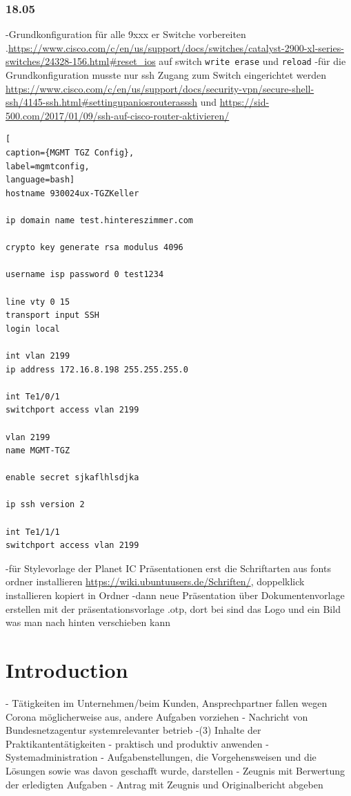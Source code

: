 \documentclass[english,runningheads,a4paper]{llncs}[2018/03/10]
\begin{document}
\subsubsection{18.05}
-Grundkonfiguration für alle 9xxx er Switche vorbereiten
.\url{https://www.cisco.com/c/en/us/support/docs/switches/catalyst-2900-xl-series-switches/24328-156.html#reset_ios} auf switch \texttt{write erase} und \texttt{reload}
-für die Grundkonfiguration musste nur ssh Zugang zum Switch eingerichtet werden \url{https://www.cisco.com/c/en/us/support/docs/security-vpn/secure-shell-ssh/4145-ssh.html#settingupaniosrouterasssh} und \url{https://sid-500.com/2017/01/09/ssh-auf-cisco-router-aktivieren/}
\begin{lstlisting}[
caption={MGMT TGZ Config},
label=mgmtconfig,
language=bash]
hostname 930024ux-TGZKeller

ip domain name test.hintereszimmer.com

crypto key generate rsa modulus 4096

username isp password 0 test1234

line vty 0 15
transport input SSH
login local

int vlan 2199
ip address 172.16.8.198 255.255.255.0

int Te1/0/1
switchport access vlan 2199

vlan 2199
name MGMT-TGZ

enable secret sjkaflhlsdjka

ip ssh version 2

int Te1/1/1 
switchport access vlan 2199
\end{lstlisting}
-für Stylevorlage der Planet IC Präsentationen erst die Schriftarten aus fonts ordner installieren \url{https://wiki.ubuntuusers.de/Schriften/}, doppelklick installieren kopiert in Ordner 
-dann neue Präsentation über Dokumentenvorlage erstellen mit der präsentationsvorlage .otp, dort bei  sind das Logo und ein Bild was man nach hinten verschieben kann
\section{Introduction}\label{sec:intro}
- Tätigkeiten im Unternehmen/beim Kunden, Ansprechpartner fallen wegen Corona möglicherweise aus, andere Aufgaben vorziehen
- Nachricht von Bundesnetzagentur systemrelevanter betrieb
-(3) Inhalte der Praktikantentätigkeiten
- praktisch und produktiv anwenden
- Systemadministration
- Aufgabenstellungen,  die  Vorgehensweisen  und  die  Lösungen sowie was davon geschafft wurde, darstellen
- Zeugnis mit Berwertung der erledigten Aufgaben
- Antrag mit Zeugnis und Originalbericht abgeben
\end{document}
